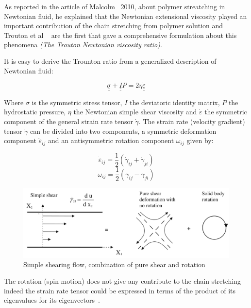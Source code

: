 As reported in the article of Malcolm~\cite{mack} 2010, about polymer streatching in Newtonian fluid, he explained that the Newtonian extensional viscosity played an important contribution of the chain stretching from polymer solution and Trouton et al ~\cite{trouton} are the first that gave a comprehensive formulation about this phenomena \textit{(The Trouton Newtonian viscosity ratio)}.

It is easy to derive the Trounton ratio from a generalized description of Newtonian fluid:

\begin{equation}
\underline{\underline\sigma} + \underline{\underline I} P = 2\eta \underline{\underline{\dot{\varepsilon}}} 
\label{eq:trouton}
\end{equation}


Where $\sigma$ is the symmetric stress tensor, $I$ the deviatoric identity matrix, $P$ the hydrostatic pressure, $\eta$ the Newtonian simple shear viscosity and $\dot\varepsilon$ the symmetric component of the general strain rate tensor $\dot\gamma$. The strain rate (velocity gradient) tensor $\dot{\gamma}$ can be divided into two components,  a symmetric deformation component $\dot\varepsilon_{ij}$ and an antisymmetric rotation component $\omega_{ij}$ given by:

\begin{equation}
\dot\varepsilon_{ij} = \frac{1}{2} (\dot{\gamma}_{ij}+\dot{\gamma}_{ji})
\label{eq:epsil}
\end{equation}
\begin{equation}
\omega_{ij} = \frac{1}{2} (\dot{\gamma}_{ij}-\dot{\gamma}_{ji})
\label{eq:epsil}
\end{equation}

\begin{figure}[h]
\centering
\includegraphics[width=.7\textwidth]{shear.png}
\caption{Simple shearing flow, combination of pure shear and rotation}
\end{figure}

The rotation (spin motion) does not give any contribute to the chain stretching indeed the strain rate 
tensor could be expressed in terms of the product of its eigenvalues for its eigenvectors~\cite{collins}. 

